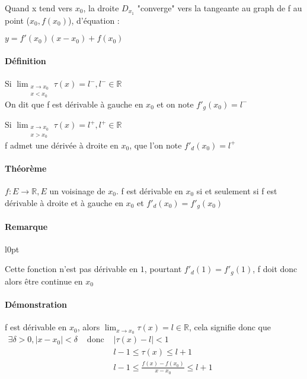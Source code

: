 Quand x tend vers $x_0$, la droite $D_{x_1}$  "converge" vers la tangeante au graph de f au point ($x_0, f(x_0)$), d'équation :

$y = f'(x_0)(x-x_0)+f(x_0)$

\paragraph{Définition}
Si $\lim_{\substack{x \to x_0 \\ x < x_0}} \tau (x) = l^-, l^- \in \mathbb{R}$~\\
On dit que f est dérivable à gauche en $x_0$ et on note $f'_g(x_0) = l^-$

Si $\lim_{\substack{x \to x_0 \\ x > x_0}} \tau (x) = l^+, l^+ \in \mathbb{R}$~\\
f admet une dérivée à droite en $x_0$, que l'on note $f'_d(x_0) = l^+$

\paragraph{Théorème} $f:E \rightarrow \mathbb{R}, E$ un voisinage de $x_0$. f est dérivable en $x_0$ si et seulement si f est dérivable à droite et à gauche en $x_0$ et $f'_d(x_0) = f'_g(x_0)$

\paragraph{Remarque}
\begin{wrapfigure}[5]{l}{0pt}
\end{wrapfigure}
Cette fonction n'est pas dérivable en $1$, pourtant $f'_d(1) = f'_g(1)$, f doit donc alors être continue en $x_0$

\paragraph{Démonstration} f est dérivable en $x_0$, alors $\lim_{x \to x_0} \tau (x) = l \in \mathbb{R}$, cela signifie donc que $\begin{array} {rcl}
	\exists \delta > 0, |x-x_0| < \delta &\text{ donc }& |\tau (x) - l| < 1 \\
																						 & & l-1 \leq \tau (x) \leq l+1 \\
																				   & & l-1 \leq \frac{f(x) - f(x_0)}{x-x_0} \leq l+1 \end{array}$

